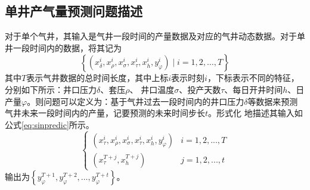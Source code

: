 \subsection{单井产气量预测问题描述}
对于单个气井，其输入是气井一段时间的产量数据及对应的气井动态数据。对于单井一段时间内的数据，将其记为
\begin{equation}
    \left\{ (x_{\delta}^i, x_{\rho}^i, x_{\sigma}^i, x_{\tau}^i, x_{h}^i, y^i_{\varphi }) \mid i = 1, 2, \ldots, T \right\}
    \label{eq:singlewell}
\end{equation}
其中\( T \)表示气井数据的总时间长度，其中上标$i$表示时刻$i$，下标表示不同的特征，分别如下所示：井口压力\( \delta \)、套压\( \rho \)、
井口温度\( \sigma \)、投产天数\( \tau \)、每日开井时间$h$、日产量$\varphi $。则问题可以定义为：基于气井过去一段时间内的井口压力\( \delta \)等数据来预测气井未来一段时间内的产量，记要预测的未来时间步长$t$。形式化
地描述其输入如公式\eqref{eq:sinpredic}所示。
\begin{equation}
    \left\{
    \begin{array}{ll}
    (x_{\tau}^i, x_{\rho}^i, x_{\sigma}^i, x_{\tau}^i, x_{h}^i, y_{\varphi }^i) &  i = 1, 2, ..., T \\
    (x_{\tau}^{T+j}, x_{h}^{T+j}) & j = 1, 2, ..., t
    \end{array}
    \right.
    \label{eq:sinpredic}
\end{equation}    
输出为$\left\{ y^{T+1}_{\varphi}, y^{T+2}_{\varphi}, \ldots, y^{T+t}_{\varphi} \right\}$。

